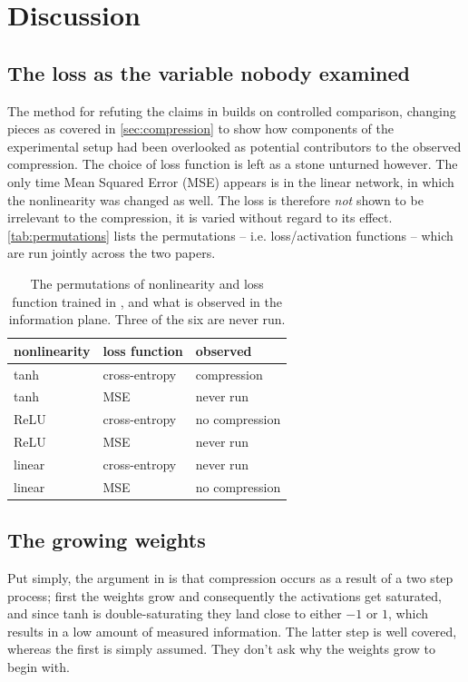\section{Discussion}\label{sec:discussion}

\subsection{The loss as the variable nobody examined}
The method for refuting the claims in \cite{shwartzziv2017} builds on
controlled comparison, changing pieces as covered in
\autoref{sec:compression} to show how components of the experimental setup had
been overlooked as potential contributors to the observed compression. The
choice of loss function is left as a stone unturned however. The only time
Mean Squared Error (MSE) appears is in the linear network, in which the
nonlinearity was changed as well. The loss is therefore \textit{not} shown to
be irrelevant to the compression, it is varied without regard to its effect.
\autoref{tab:permutations} lists the permutations -- i.e. loss/activation
functions -- which are run jointly across the two papers.

\begin{table}[t]
\centering
\caption{The permutations of nonlinearity and loss function trained in
\cite{saxe2018}, and what is observed in the information plane. Three of the
six are never run.}
\label{tab:permutations}
\begin{tabular}{lll}
\toprule
nonlinearity & loss function & observed \\
\midrule
tanh   & cross-entropy & compression \\
tanh   & MSE & never run \\
ReLU   & cross-entropy & no compression \\
ReLU   & MSE & never run \\
linear & cross-entropy & never run \\
linear & MSE & no compression \\
\bottomrule
\end{tabular}
\end{table}

\subsection{The growing weights}
Put simply, the argument in \cite{saxe2018} is that compression occurs as a
result of a two step process; first the weights grow and consequently the
activations get saturated, and since tanh is double-saturating they land close
to either $-1$ or $1$, which results in a low amount of measured information.
The latter step is well covered, whereas the first is simply assumed. They
don't ask why the weights grow to begin with.

